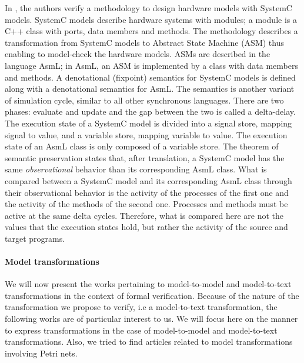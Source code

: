 \documentclass[pdflatex,sn-mathphys]{sn-jnl}%
\theoremstyle{thmstyleone}%
\theoremstyle{thmstyletwo}%
\theoremstyle{thmstylethree}%
\begin{document}
In \cite{Habibi2006}, the authors verify a methodology to design
hardware models with SystemC models. SystemC models describe hardware
systems with modules; a module is a C++ class with ports, data members
and methods. The methodology describes a transformation from SystemC
models to Abstract State Machine (ASM) thus enabling to model-check
the hardware models. ASMs are described in the language AsmL; in AsmL,
an ASM is implemented by a class with data members and methods. A
denotational (fixpoint) semantics for SystemC models is defined along
with a denotational semantics for AsmL. The semantics is another
variant of simulation cycle, similar to all other synchronous
languages. There are two phases: evaluate and update and the gap
between the two is called a delta-delay. The execution state of a
SystemC model is divided into a signal store, mapping signal to value,
and a variable store, mapping variable to value. The execution state
of an AsmL class is only composed of a variable store. The theorem of
semantic preservation states that, after translation, a SystemC model
has the same \textit{observational} behavior than its corresponding
AsmL class. What is compared between a SystemC model and its
corresponding AsmL class through their observational behavior is the
activity of the processes of the first one and the activity of the
methods of the second one. Processes and methods must be active at the
same delta cycles. Therefore, what is compared here are not the values
that the execution states hold, but rather the activity of the source
and target programs.

\paragraph{Model transformations}


We will now present the works pertaining to model-to-model and
model-to-text transformations in the context of formal
verification. Because of the nature of the transformation we propose
to verify, i.e a model-to-text transformation, the following works are
of particular interest to us. We will focus here on the manner to
express transformations in the case of model-to-model and
model-to-text transformations. Also, we tried to find articles related
to model transformations involving Petri nets.
\end{document}
